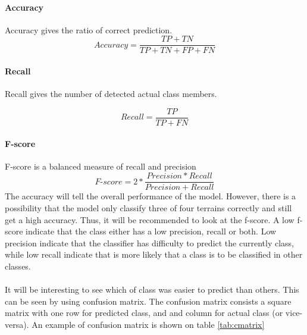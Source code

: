 \documentclass[USenglish]{ifimaster}  %
\begin{document}
	\paragraph{Accuracy}
	Accuracy gives the ratio of correct prediction. 
	\begin{equation}
	Accuracy = \frac{TP + TN}{TP + TN + FP + FN}
	\label{eq:acc}
	\end{equation}
	
	\paragraph{Recall}
	Recall gives the number of detected actual class members.
	
	\begin{equation}
	Recall = \frac{TP}{TP + FN}
	\label{eq:recall}
	\end{equation}
	
	\paragraph{F-score}
	F-score is a balanced measure of recall and precision 
	\begin{equation}
	\textit{F-score} = 2*\frac{Precision*Recall}{Precision + Recall}
	\label{eq:fscore}
	\end{equation}
	\FloatBarrier
The accuracy will tell the overall performance of the model. However, there is a possibility that the model only classify three of four terrains correctly and still get a high accuracy. Thus, it will be recommended to look at the f-score. A low f-score indicate that the class either has a low precision, recall or both. Low precision indicate that the classifier has difficulty to predict the currently class, while low recall indicate that is more likely that a class is to be classified in other classes.
\\
\\
It will be interesting to see which of class was easier to predict than others. This can be seen by using confusion matrix. The confusion matrix consists a square matrix with one row for predicted class, and and column for actual class (or vice-versa).
An example of confusion matrix is shown on table \ref{tab:cmatrix}
	
\end{document}
